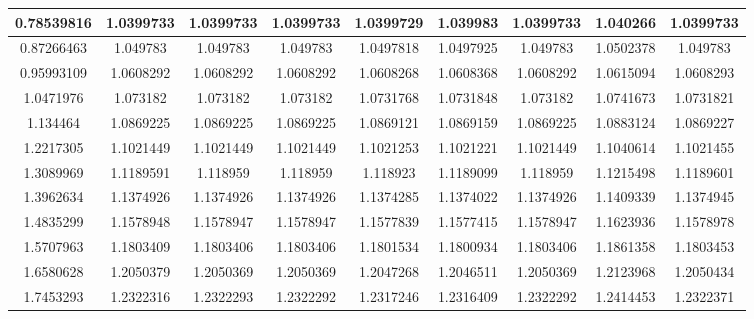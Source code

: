 \documentclass{article}
\begin{document}
\begin{landscape}
\begin{table}[]
\begin{tabular}{|c|c|c|c|c|c|c|c|c|}
	0.78539816                                               & 1.0399733     & 1.0399733     & 1.0399733      & 1.0399729    & 1.039983     & 1.0399733     & 1.040266   & 1.0399733  \\ \hline
	0.87266463                                               & 1.049783      & 1.049783      & 1.049783       & 1.0497818    & 1.0497925    & 1.049783      & 1.0502378  & 1.049783   \\ \hline
	0.95993109                                               & 1.0608292     & 1.0608292     & 1.0608292      & 1.0608268    & 1.0608368    & 1.0608292     & 1.0615094  & 1.0608293  \\ \hline
	1.0471976                                                & 1.073182      & 1.073182      & 1.073182       & 1.0731768    & 1.0731848    & 1.073182      & 1.0741673  & 1.0731821  \\ \hline
	1.134464                                                 & 1.0869225     & 1.0869225     & 1.0869225      & 1.0869121    & 1.0869159    & 1.0869225     & 1.0883124  & 1.0869227  \\ \hline
	1.2217305                                                & 1.1021449     & 1.1021449     & 1.1021449      & 1.1021253    & 1.1021221    & 1.1021449     & 1.1040614  & 1.1021455  \\ \hline
	1.3089969                                                & 1.1189591     & 1.118959      & 1.118959       & 1.118923     & 1.1189099    & 1.118959      & 1.1215498  & 1.1189601  \\ \hline
	1.3962634                                                & 1.1374926     & 1.1374926     & 1.1374926      & 1.1374285    & 1.1374022    & 1.1374926     & 1.1409339  & 1.1374945  \\ \hline
	1.4835299                                                & 1.1578948     & 1.1578947     & 1.1578947      & 1.1577839    & 1.1577415    & 1.1578947     & 1.1623936  & 1.1578978  \\ \hline
	1.5707963                                                & 1.1803409     & 1.1803406     & 1.1803406      & 1.1801534    & 1.1800934    & 1.1803406     & 1.1861358  & 1.1803453  \\ \hline
	1.6580628                                                & 1.2050379     & 1.2050369     & 1.2050369      & 1.2047268    & 1.2046511    & 1.2050369     & 1.2123968  & 1.2050434  \\ \hline
	1.7453293                                                & 1.2322316     & 1.2322293     & 1.2322292      & 1.2317246    & 1.2316409    & 1.2322292     & 1.2414453  & 1.2322371  \\ \hline

\end{tabular}
\end{table}
\end{landscape}
\end{document}

